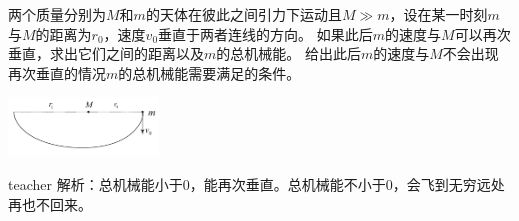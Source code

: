 \begin{example}
两个质量分别为$M$和$m$的天体在彼此之间引力下运动且$M\gg m$，设在某一时刻$m$与$M$的距离为$r_0$，速度$v_0$垂直于两者连线的方向。
如果此后$m$的速度与$M$可以再次垂直，求出它们之间的距离以及$m$的总机械能。
给出此后$m$的速度与$M$不会出现再次垂直的情况$m$的总机械能需要满足的条件。

\includegraphics[width=0.3\textwidth]{images/gravity-ex2.pdf}
\begin{taggedblock}{teacher}
\newline
解析：总机械能小于0，能再次垂直。总机械能不小于0，会飞到无穷远处再也不回来。
\end{taggedblock}
\end{example}



